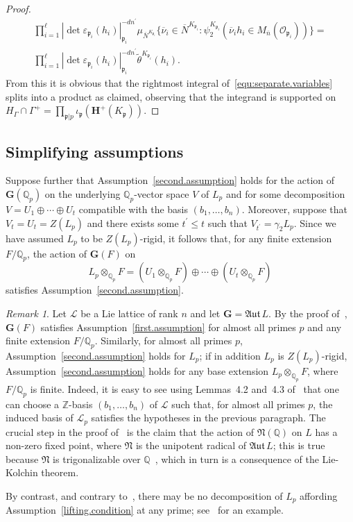 \documentclass[11pt,a4paper]{amsart}
\theoremstyle{plain}
\theoremstyle{remark}
\newtheorem{rem}[thm]{Remark}
\newcommand{\Z}{\mathbb{Z}}
\newcommand{\Q}{\mathbb{Q}}
\newcommand{\tensor}{\otimes}
\newcommand{\p}{\mathfrak{p}}
\newcommand{\npr}{\ell}
\newcommand{\dimL}{n}
\newcommand{\overdim}{\overline{n}}
\def \aAut {\mathfrak{Aut} \,}
\def \p {\ensuremath{\mathfrak{p}}}
\begin{document}
\begin{proof}
\begin{multline*}
\prod_{i = 1}^\npr  | \det \varepsilon_{\p_i}(h_i) |_{\p_i}^{-d \dimL^\prime} \mu_{\overline{N}^{K_{\p_i}}}\{ \overline{\nu}_i \in \overline{N}^{K_{\p_i}} : \psi^{K_{\p_i}}_2(\overline{\nu}_i h_i \in M_{\overdim}(\mathcal{O}_{\p_i})) \}  = \\
\prod_{i = 1}^\npr | \det \varepsilon_{\p_i}(h_i) |_{\p_i}^{-d \dimL^\prime} \widetilde{\theta}^{K_{\p_i}} (h_i).
\end{multline*}
From this it is obvious that the rightmost integral of~\eqref{equ:separate.variables} splits into a product as claimed, observing that the integrand is supported on $H_\Gamma \cap \Gamma^+ = \prod_{\p | p} \iota_\p (\mathbf{H}^+(K_\p))$.
\end{proof}


\subsection{Simplifying assumptions} \label{sec:simplifying.assumptions}
Suppose further that Assumption~\ref{second.assumption} holds for the action of $\mathbf{G}(\Q_p)$ on the underlying $\Q_p$-vector space $V$ of $L_p$ and for some decomposition
$ V = U_1 \oplus \cdots \oplus U_t$
compatible with the basis $(b_1, \dots, b_\dimL)$.  Moreover, suppose that $V_t = U_t = Z(L_p)$ and there exists some $t^\prime \leq t$ such that $V_{t^\prime} = \gamma_2 L_p$.  
Since we have assumed $L_p$ to be $Z(L_p)$-rigid, it follows that, for any finite extension $F/\Q_p$, the action of $\mathbf{G}(F)$ on
$$ L_p \tensor_{\Q_p} F = (U_1 \tensor_{\Q_p} F) \oplus \cdots \oplus (U_t \tensor_{\Q_p} F)$$
satisfies Assumption~\ref{second.assumption}.  
\begin{rem} \label{rmk:almost.all.primes}
Let $\mathcal{L}$ be a Lie lattice of rank $\dimL$ and let $\mathbf{G} = \aAut L$.  By the proof of~\cite[Lemma~4.1]{duSLubotzky/96}, $\mathbf{G}(F)$ satisfies Assumption~\ref{first.assumption} for almost all primes $p$ and any finite extension $F / \Q_p$.  Similarly, for almost all primes $p$, Assumption~\ref{second.assumption} holds for $L_p$; if in addition $L_p$ is $Z(L_p)$-rigid, Assumption~\ref{second.assumption} holds for any base extension $L_p \tensor_{\Q_p} F$, where $F / \Q_p$ is finite.  
Indeed, it is easy to see using Lemmas~4.2 and~4.3 of~\cite{duSLubotzky/96} that one can choose a $\Z$-basis $(b_1, \dots, b_{\dimL})$ of $\mathcal{L}$ such that, for almost all primes $p$, the induced basis of $\mathcal{L}_p$ satisfies the hypotheses in the previous paragraph.  The crucial step in the proof of~\cite[Lemma~4.3]{duSLubotzky/96} is the claim that the action of $\mathfrak{N}(\Q)$ on $L$ has a non-zero fixed point, where $\mathfrak{N}$ is the unipotent radical of $\aAut L$; this is true because $\mathfrak{N}$ is trigonalizable over $\Q$~\cite[Theorem~15.4(ii)]{Borel/91}, which in turn is a consequence of the Lie-Kolchin theorem.

By contrast, and contrary to~\cite[Corollary~4.5]{duSLubotzky/96}, there may be no decomposition of $L_p$ affording Assumption~\ref{lifting.condition} at any prime; see~\cite[p.~6]{Berman/11} for an example.
\end{rem}
\end{document}
